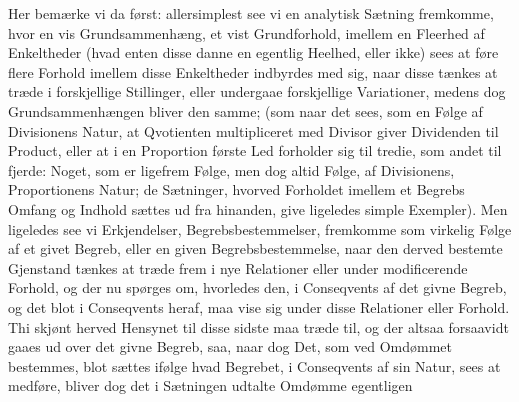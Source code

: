 \documentclass[12pt]{book}
\def\textit#1{#1}%
\newcommand{\opage}[1]{\marginnote{\footnotesize\textit{[#1]}}}
\begin{document}
Her bemærke vi da først: allersimplest see vi en analytisk Sætning fremkomme,
hvor en vis Grundsammenhæng, et vist Grundforhold, imellem en Fleerhed af
Enkeltheder (hvad enten
\opage{309} disse danne en egentlig Heelhed, eller ikke) sees at føre flere Forhold imellem
disse Enkeltheder indbyrdes med sig, naar disse tænkes at træde i forskjellige
Stillinger, eller undergaae forskjellige Variationer, medens dog
Grundsammenhængen bliver den samme; (som naar det sees, som en Følge af
Divisionens Natur, at Qvotienten multipliceret med Divisor giver Dividenden til
Product, eller at i en Proportion første Led forholder sig til tredie, som andet
til fjerde: Noget, som er ligefrem Følge, men dog altid Følge, af Divisionens,
Proportionens Natur; de Sætninger, hvorved Forholdet imellem et Begrebs Omfang
og Indhold sættes ud fra hinanden, give ligeledes simple Exempler). Men
ligeledes see vi Erkjendelser, Begrebsbestemmelser, fremkomme som virkelig Følge
af et givet Begreb, eller en given Begrebsbestemmelse, naar den derved bestemte
Gjenstand tænkes at træde frem i nye Relationer eller under modificerende
Forhold, og der nu spørges om, hvorledes den, i Conseqvents af det givne Begreb,
og det blot i Conseqvents heraf, maa vise sig under disse Relationer eller
Forhold. Thi skjønt herved Hensynet til disse sidste maa træde til, og der
altsaa forsaavidt gaaes ud over det givne Begreb, saa, naar dog Det, som ved
Omdømmet bestemmes, blot sættes ifølge hvad Begrebet, i Conseqvents af sin
Natur, sees at medføre, bliver dog det i Sætningen udtalte Omdømme egentligen
\end{document}

